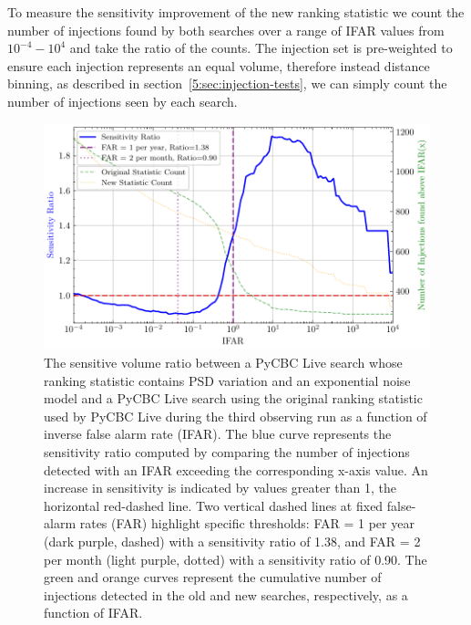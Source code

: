 
To measure the sensitivity improvement of the new ranking statistic we count the number of injections found by both searches over a range of IFAR values from $10^{-4} - 10^{4}$ and take the ratio of the counts. The injection set is pre-weighted to ensure each injection represents an equal volume, therefore instead distance binning, as described in section~\ref{5:sec:injection-tests}, we can simply count the number of injections seen by each search.
%
\begin{figure}
  \centering
  \begin{minipage}[t]{1.0\linewidth}
  
    \includegraphics[width=1.0\textwidth]{images/5_pycbclive/fits-psd/fits_psd_vt_ratio_with_counts.pdf}
    \caption{The sensitive volume ratio between a PyCBC Live search whose ranking statistic contains PSD variation and an exponential noise model and a PyCBC Live search using the original ranking statistic used by PyCBC Live during the third observing run as a function of inverse false alarm rate (IFAR). The blue curve represents the sensitivity ratio computed by comparing the number of injections detected with an IFAR exceeding the corresponding x-axis value. An increase in sensitivity is indicated by values greater than 1, the horizontal red-dashed line. Two vertical dashed lines at fixed false-alarm rates (FAR) highlight specific thresholds: FAR = 1 per year (dark purple, dashed) with a sensitivity ratio of 1.38, and FAR = 2 per month (light purple, dotted) with a sensitivity ratio of 0.90. The green and orange curves represent the cumulative number of injections detected in the old and new searches, respectively, as a function of IFAR.}
    \label{5:fig:fits-psdvar-sensitivity}

  \end{minipage}
\end{figure}
